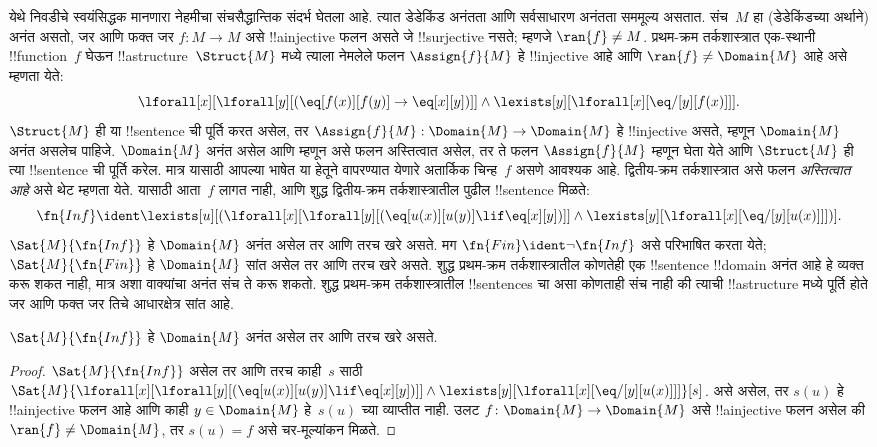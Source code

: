 \documentclass[../../../include/open-logic-section]{subfiles}
\begin{document}


येथे निवडीचे स्वयंसिद्धक मानणारा नेहमीचा
संचसैद्धान्तिक संदर्भ घेतला आहे. त्यात डेडेकिंड अनंतता
आणि सर्वसाधारण अनंतता सममूल्य असतात.
संच~$M$ हा
(डेडेकिंडच्या अर्थाने)
अनंत असतो,
जर आणि फक्त जर
$f\colon M
\to M$ असे
!!a{injective}
फलन असते जे
!!{surjective}
नसते; म्हणजे
$\ran{f} \neq M$.
प्रथम-क्रम
तर्कशास्त्रात
एक-स्थानी
!!{function}~$f$
घेऊन
!!a{structure}~$\Struct{M}$
मध्ये त्याला
नेमलेले फलन
$\Assign{f}{M}$
हे !!{injective}
आहे आणि
$\ran{f} \neq
\Domain{M}$
आहे असे
म्हणता येते:
\[
\lforall[x][\lforall[y][(\eq[f(x)][f(y)] \to \eq[x][y])]] \land
\lexists[y][\lforall[x][\eq/[y][f(x)]]].
\]
$\Struct{M}$
ही या
!!{sentence}
ची पूर्ति करत
असेल, तर
$\Assign{f}{M}:
\Domain{M} \to \Domain{M}$
हे !!{injective}
असते, म्हणून
$\Domain{M}$
अनंत असलेच
पाहिजे.
$\Domain{M}$
अनंत असेल
आणि म्हणून
असे फलन
अस्तित्वात असेल,
तर ते फलन
$\Assign{f}{M}$
म्हणून घेता
येते आणि
$\Struct{M}$
ही त्या
!!{sentence}
ची पूर्ति करेल.
मात्र यासाठी
आपल्या भाषेत
या हेतूने
वापरण्यात येणारे
अतार्किक चिन्ह~$f$
असणे आवश्यक
आहे.
द्वितीय-क्रम
तर्कशास्त्रात
असे फलन
\emph{अस्तित्वात आहे}
असे थेट
म्हणता येते.
यासाठी
आता~$f$
लागत नाही,
आणि शुद्ध
द्वितीय-क्रम
तर्कशास्त्रातील
पुढील
!!{sentence}
मिळते:
\[
\fn{Inf} \ident \lexists[u][(\lforall[x][\lforall[y][(\eq[u(x)][u(y)]
      \lif \eq[x][y])]] \land \lexists[y][\lforall[x][\eq/[y][u(x)]]])].
\]
$\Sat{M}{\fn{Inf}}$
हे
$\Domain{M}$
अनंत असेल
तर आणि तरच
खरे असते.
मग
$\fn{Fin} \ident \lnot \fn{Inf}$
असे परिभाषित
करता येते;
$\Sat{M}{\fn{Fin}}$
हे
$\Domain{M}$
सांत असेल
तर आणि तरच
खरे असते.
शुद्ध प्रथम-क्रम
तर्कशास्त्रातील
कोणतेही एक
!!{sentence}
!!{domain}
अनंत आहे
हे व्यक्त
करू शकत
नाही, मात्र
अशा वाक्यांचा
अनंत संच
ते करू शकतो.
शुद्ध प्रथम-क्रम
तर्कशास्त्रातील
!!{sentence}s
चा असा
कोणताही संच
नाही की
त्याची
!!a{structure}
मध्ये पूर्ति
होते जर आणि
फक्त जर तिचे
आधारक्षेत्र
सांत आहे.

\begin{prop}
$\Sat{M}{\fn{Inf}}$
हे
$\Domain{M}$
अनंत असेल
तर आणि तरच
खरे असते.
\end{prop}

\begin{proof}
$\Sat{M}{\fn{Inf}}$
असेल तर आणि
तरच काही~$s$
साठी
  $\Sat{M}{\lforall[x][\lforall[y][(\eq[u(x)][u(y)] \lif \eq[x][y])]]
    \land \lexists[y][\lforall[x][\eq/[y][u(x)]]]}[s]$.
  असे असेल,
  तर $s(u)$
  हे !!a{injective}
  फलन आहे
  आणि काही
  $y
  \in \Domain{M}$
  हे~$s(u)$
  च्या व्याप्तीत
  नाही.
  उलट
  $f\colon \Domain{M} \to \Domain{M}$
  असे
  !!a{injective}
  फलन असेल
  की
  $\ran{f}
  \neq \Domain{M}$,
  तर
  $s(u) = f$
  असे चर-मूल्यांकन
  मिळते.
\end{proof}
\end{document}
